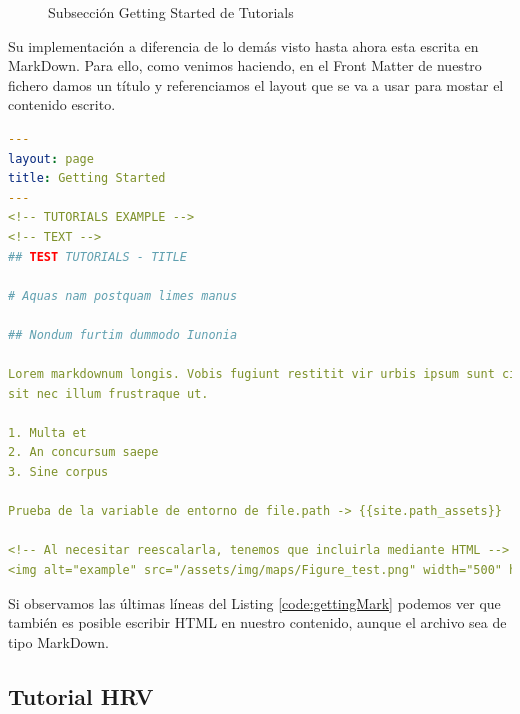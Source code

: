 \begin{figure}[H]
    \centering
    \caption{Subsección Getting Started de Tutorials }
    \label{fig:my_label}
\end{figure}

Su implementación a diferencia de lo demás visto hasta ahora esta escrita en MarkDown. Para ello, como venimos haciendo, en el Front Matter de nuestro fichero damos un título y referenciamos el layout que se va a usar para mostar el contenido escrito. 

\begin{lstlisting}[language=yaml,caption=getting\_started.md,label={code:gettingMark}]
  ---
layout: page
title: Getting Started
---
<!-- TUTORIALS EXAMPLE -->
<!-- TEXT -->
## TEST TUTORIALS - TITLE

# Aquas nam postquam limes manus

## Nondum furtim dummodo Iunonia

Lorem markdownum longis. Vobis fugiunt restitit vir urbis ipsum sunt circuiere
sit nec illum frustraque ut.

1. Multa et
2. An concursum saepe
3. Sine corpus

Prueba de la variable de entorno de file.path -> {{site.path_assets}}

<!-- Al necesitar reescalarla, tenemos que incluirla mediante HTML -->
<img alt="example" src="/assets/img/maps/Figure_test.png" width="500" height="200">
\end{lstlisting}

Si observamos las  últimas líneas del Listing \ref{code:gettingMark} podemos ver que también es posible escribir HTML en nuestro contenido, aunque el archivo sea de tipo MarkDown.

\subsection*{Tutorial HRV}



